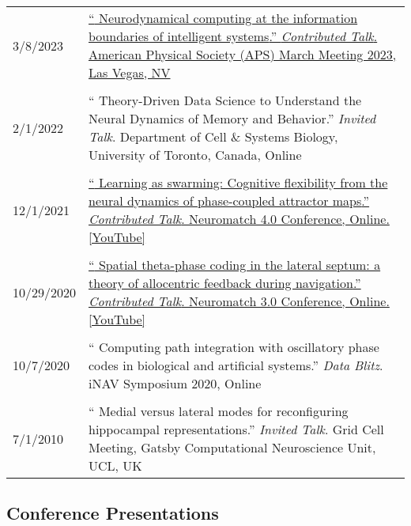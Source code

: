 \documentclass[10pt]{article}
\newcommand{\itemtitle}[1]{{\color{hopkinsblue}\ul{#1}}}
\newcommand{\unpubtitle}[1]{{\color{hopkinsblue} #1}}
\begin{document}
\begin{tabular}{@{\hspace{0.2in}}l>{\raggedright\arraybackslash}p{}}
  3/8/2023 \hspace{0.2in} & \href{https://meetings.aps.org/Meeting/MAR23/Session/M01.13}{
    ``\unpubtitle{Neurodynamical computing at the information boundaries of
    intelligent systems}.'' \emph{Contributed Talk}. American Physical Society (APS)
  March Meeting 2023, Las Vegas, NV} \\
  \tabularnewline
  2/1/2022 \hspace{0.2in} & ``\unpubtitle{Theory-Driven Data Science to
  Understand the Neural Dynamics of Memory and Behavior}.'' \emph{Invited Talk}.
  Department of Cell \& Systems Biology, University of Toronto, Canada, Online \\
  \tabularnewline
  12/1/2021 \hspace{0.2in} &
  \href{https://youtu.be/3mKkLksOyfk}{``\unpubtitle{Learning as swarming:
      Cognitive flexibility from the neural dynamics of phase-coupled attractor
    maps}.'' \emph{Contributed Talk}. Neuromatch 4.0 Conference, Online.
  \itemtitle{[YouTube]}}\\
  \tabularnewline
  10/29/2020 \hspace{0.2in} &
  \href{https://www.youtube.com/watch?v=WwYDMpD7j4Q}{``\unpubtitle{Spatial
      theta-phase coding in the lateral septum: a theory of allocentric feedback
    during navigation}.'' \emph{Contributed Talk}. Neuromatch 3.0 Conference,
  Online. \itemtitle{[YouTube]}}\\
  \tabularnewline
  10/7/2020 \hspace{0.2in} & ``\unpubtitle{Computing path integration with
  oscillatory phase codes in biological and artificial systems}.'' \emph{Data
  Blitz}. iNAV Symposium 2020, Online\\
  \tabularnewline
  7/1/2010 \hspace{0.2in} & ``\unpubtitle{Medial versus lateral modes for
  reconfiguring hippocampal representations}.'' \emph{Invited Talk}. Grid
  Cell Meeting, Gatsby Computational Neuroscience Unit, UCL, UK\\
\end{tabular}


\pagebreak
\subsection*{Conference Presentations}
\label{sec:posters}
\end{document}

